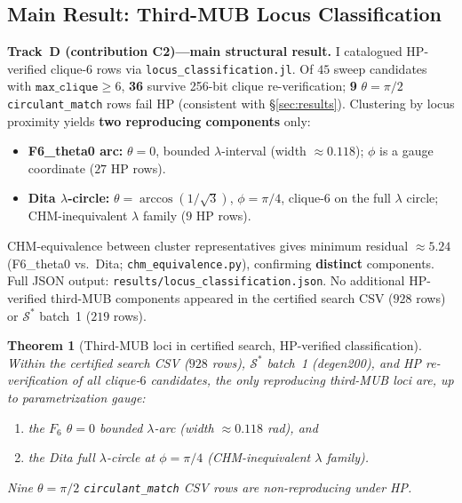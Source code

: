 \documentclass[onecolumn]{IEEEtran}
\newcommand{\repo}[1]{{\ttfamily\nolinkurl{#1}}}
\newtheorem{theorem}{Theorem}
\begin{document}
\subsection{Main Result: Third-MUB Locus Classification}
\label{sec:trackd}
\textbf{Track~D (contribution C2)---main structural result.}
I catalogued HP-verified clique-$6$ rows via \repo{locus_classification.jl}.
Of $45$ sweep candidates with $\texttt{max\_clique}\ge6$, \textbf{36} survive 256-bit clique re-verification; \textbf{9} $\theta=\pi/2$ \texttt{circulant\_match} rows fail HP (consistent with \S\ref{sec:results}).
Clustering by locus proximity yields \textbf{two reproducing components} only:
\begin{itemize}
    \item \textbf{F6\_theta0 arc:} $\theta=0$, bounded $\lambda$-interval (width $\approx0.118$); $\phi$ is a gauge coordinate ($27$ HP rows).
    \item \textbf{Dita $\lambda$-circle:} $\theta=\arccos(1/\sqrt{3})$, $\phi=\pi/4$, clique-$6$ on the full $\lambda$ circle; CHM-inequivalent $\lambda$ family ($9$ HP rows).
\end{itemize}
CHM-equivalence between cluster representatives gives minimum residual $\approx5.24$ (F6\_theta0 vs.\ Dita; \texttt{chm\_equivalence.py}), confirming \textbf{distinct} components.
Full JSON output: \repo{results/locus_classification.json}.
No additional HP-verified third-MUB components appeared in the certified search CSV ($928$ rows) or $\mathcal{S}^*$ batch~1 ($219$ rows).

\begin{theorem}[Third-MUB loci in certified search, HP-verified classification]
\label{thm:trackd}
Within the certified search CSV ($928$ rows), $\mathcal{S}^*$ batch~1 (degen200), and HP re-verification of all clique-$6$ candidates, the only reproducing third-MUB loci are, up to parametrization gauge:
\begin{enumerate}
    \item the $F_6$ $\theta{=}0$ bounded $\lambda$-arc (width $\approx0.118$ rad), and
    \item the Dita full $\lambda$-circle at $\phi=\pi/4$ (CHM-inequivalent $\lambda$ family).
\end{enumerate}
Nine $\theta=\pi/2$ \texttt{circulant\_match} CSV rows are non-reproducing under HP.
\end{theorem}
\end{document}
